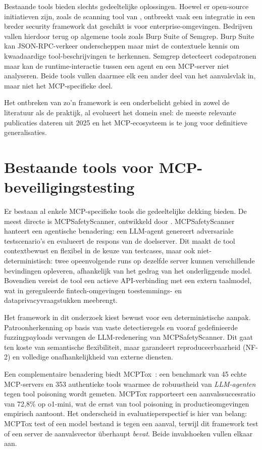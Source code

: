 Bestaande tools bieden slechts gedeeltelijke oplossingen. Hoewel er open-source initiatieven zijn, zoals de scanning tool van \textcite{Invariant2025}, ontbreekt vaak een integratie in een breder security framework dat geschikt is voor enterprise-omgevingen. Bedrijven vallen hierdoor terug op algemene tools zoals Burp Suite of Semgrep. Burp Suite kan JSON-RPC-verkeer onderscheppen maar mist de contextuele kennis om kwaadaardige tool-beschrijvingen te herkennen. Semgrep detecteert codepatronen maar kan de runtime-interactie tussen een agent en een MCP-server niet analyseren. Beide tools vullen daarmee elk een ander deel van het aanvalsvlak in, maar niet het MCP-specifieke deel.

Het ontbreken van zo'n framework is een onderbelicht gebied in zowel de literatuur als de praktijk, al evolueert het domein snel: de meeste relevante publicaties dateren uit 2025 en het MCP-ecosysteem is te jong voor definitieve generalisaties.

\section{Bestaande tools voor MCP-beveiligingstesting}

Er bestaan al enkele MCP-specifieke tools die gedeeltelijke dekking bieden. De meest directe is MCPSafetyScanner, ontwikkeld door \textcite{radosevich2025mcpsafetyaudit}. MCPSafetyScanner hanteert een agentische benadering: een LLM-agent genereert adversariale testscenario's en evalueert de respons van de doelserver. Dit maakt de tool contextbewust en flexibel in de keuze van testcases, maar ook niet-deterministisch: twee opeenvolgende runs op dezelfde server kunnen verschillende bevindingen opleveren, afhankelijk van het gedrag van het onderliggende model. Bovendien vereist de tool een actieve API-verbinding met een extern taalmodel, wat in gereguleerde fintech-omgevingen toestemmings- en dataprivacyvraagstukken meebrengt.

Het framework in dit onderzoek kiest bewust voor een deterministische aanpak. Patroonherkenning op basis van vaste detectieregels en vooraf gedefinieerde fuzzingpayloads vervangen de LLM-redenering van MCPSafetyScanner. Dit gaat ten koste van semantische flexibiliteit, maar garandeert reproduceerbaarheid (NF-2) en volledige onafhankelijkheid van externe diensten.

Een complementaire benadering biedt MCPTox~\autocite{wang2025mcptox}: een benchmark van 45 echte MCP-servers en 353 authentieke tools waarmee de robuustheid van \emph{LLM-agenten} tegen tool poisoning wordt gemeten. MCPTox rapporteert een aanvalssuccesratio van 72{,}8\% op o1-mini, wat de ernst van tool poisoning in productieomgevingen empirisch aantoont. Het onderscheid in evaluatieperspectief is hier van belang: MCPTox test of een model bestand is tegen een aanval, terwijl dit framework test of een server de aanvalsvector überhaupt \emph{bevat}. Beide invalshoeken vullen elkaar aan.

